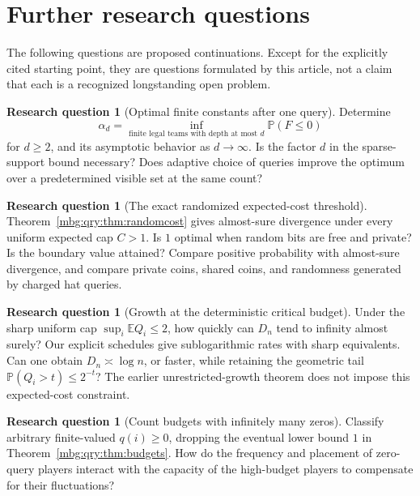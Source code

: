 \documentclass[11pt,letterpaper]{article}
\theoremstyle{definition}
\newcommand{\E}{\mathbb E}
\newcommand{\Prb}{\mathbb P}
\newtheorem{question}[theorem]{Research question}
\begin{document}
\section{Further research questions}
\label{mbg:qry:sec:questions}

The following questions are proposed continuations. Except for the
explicitly cited starting point, they are questions formulated by this
article, not a claim that each is a recognized longstanding open problem.

\begin{question}[Optimal finite constants after one query]
Determine
\[
 \alpha_d=\inf_{\text{finite legal teams with depth at most }d}
             \Prb(F\le0)
\]
for \(d\ge2\), and its asymptotic behavior as \(d\to\infty\).
Is the factor \(d\) in the sparse-support bound necessary?
Does adaptive choice of queries improve the optimum over a
predetermined visible set at the same count?
\end{question}

\begin{question}[The exact randomized expected-cost threshold]
Theorem~\ref{mbg:qry:thm:randomcost} gives almost-sure divergence under every
uniform expected cap \(C>1\). Is \(1\) optimal when random bits are
free and private? Is the boundary value attained? Compare positive
probability with almost-sure divergence, and compare private coins,
shared coins, and randomness generated by charged hat queries.
\end{question}

\begin{question}[Growth at the deterministic critical budget]
Under the sharp uniform cap \(\sup_i\E Q_i\le2\), how quickly can
\(D_n\) tend to infinity almost surely? Our explicit schedules give
sublogarithmic rates with sharp equivalents. Can one obtain
\(D_n\asymp\log n\), or faster, while retaining the geometric tail
\(\Prb(Q_i>t)\le2^{-t}\)?
The earlier unrestricted-growth theorem does not impose this
expected-cost constraint.
\end{question}

\begin{question}[Count budgets with infinitely many zeros]
Classify arbitrary finite-valued \(q(i)\ge0\), dropping the eventual
lower bound \(1\) in Theorem~\ref{mbg:qry:thm:budgets}. How do the frequency and
placement of zero-query players interact with the capacity of the
high-budget players to compensate for their fluctuations?
\end{question}
\end{document}
